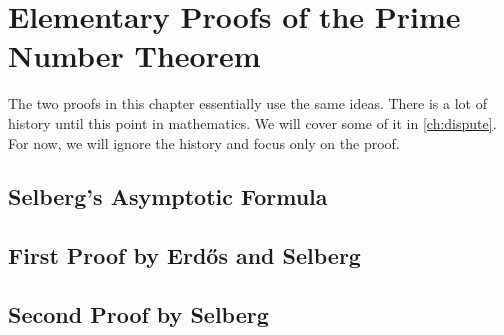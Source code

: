 \documentclass[elemannt.tex]{subfile}
\begin{document}
	\chapter{Elementary Proofs of the Prime Number Theorem}\label{ch:pnt}
	The two proofs in this chapter essentially use the same ideas. There is a lot of history until this point in mathematics. We will cover some of it in \autoref{ch:dispute}. For now, we will ignore the history and focus only on the proof.
	\section{Selberg's Asymptotic Formula}\label{sec:fundamentallemma}
	\section{First Proof by Erd\H{o}s and Selberg}
	\section{Second Proof by Selberg}
\end{document}
